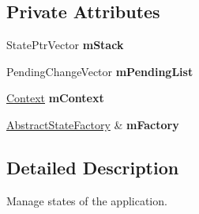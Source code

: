 \subsection*{\-Private \-Attributes}
\begin{DoxyCompactItemize}
\item 
\hypertarget{classStateStack_a1e91ad8bee74b8d3b0a79516334f876e_a1e91ad8bee74b8d3b0a79516334f876e}{\-State\-Ptr\-Vector {\bfseries m\-Stack}}\label{classStateStack_a1e91ad8bee74b8d3b0a79516334f876e_a1e91ad8bee74b8d3b0a79516334f876e}

\item 
\hypertarget{classStateStack_adbc8d0b3e30caf552c705ee189a5bcbb_adbc8d0b3e30caf552c705ee189a5bcbb}{\-Pending\-Change\-Vector {\bfseries m\-Pending\-List}}\label{classStateStack_adbc8d0b3e30caf552c705ee189a5bcbb_adbc8d0b3e30caf552c705ee189a5bcbb}

\item 
\hypertarget{classStateStack_ac5e8ff25cd93f9c4a4345be08b6da7ea_ac5e8ff25cd93f9c4a4345be08b6da7ea}{\hyperlink{classContext}{\-Context} {\bfseries m\-Context}}\label{classStateStack_ac5e8ff25cd93f9c4a4345be08b6da7ea_ac5e8ff25cd93f9c4a4345be08b6da7ea}

\item 
\hypertarget{classStateStack_a10fc35b00720872d373ea694a6a911e0_a10fc35b00720872d373ea694a6a911e0}{\hyperlink{classAbstractStateFactory}{\-Abstract\-State\-Factory} \& {\bfseries m\-Factory}}\label{classStateStack_a10fc35b00720872d373ea694a6a911e0_a10fc35b00720872d373ea694a6a911e0}

\end{DoxyCompactItemize}


\subsection{\-Detailed \-Description}
\-Manage states of the application. 

